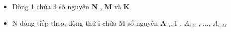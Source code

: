 \begin{itemize}
	\item     Dòng 1 chứa 3 số nguyên    \textbf{     N    }    ,    \textbf{     M    }    và    \textbf{     K    }
	\item     N dòng tiếp theo, dòng thứ i chứa M số nguyên    \textbf{     A     $_      i, 1     $}    ,    \textbf{     $A_{i,2}$}    , ...,    \textbf{     $A_{i,M}$}
\end{itemize}